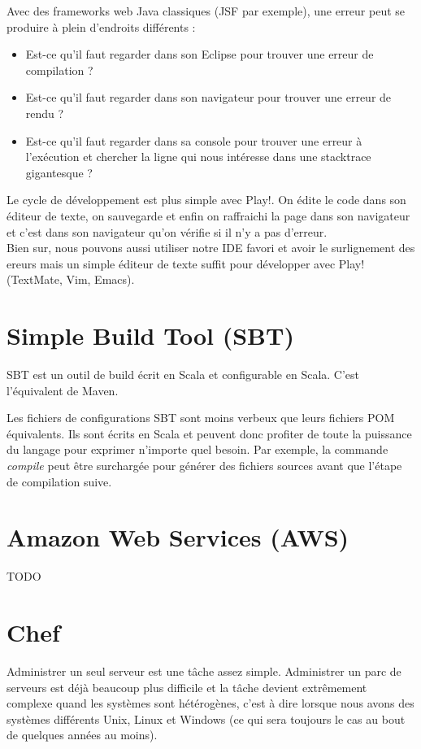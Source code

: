 Avec des frameworks web Java classiques (JSF par exemple), une erreur peut se
produire à plein d'endroits différents :
\begin{itemize}
\item Est-ce qu'il faut regarder dans son Eclipse pour trouver une erreur de
  compilation ?
\item Est-ce qu'il faut regarder dans son navigateur pour trouver une erreur de
  rendu ?
\item Est-ce qu'il faut regarder dans sa console pour trouver une erreur à
  l'exécution et chercher la ligne qui nous intéresse dans une stacktrace
  gigantesque ? 
\end{itemize}

\bigskip

Le cycle de développement est plus simple avec Play!.
On édite le code dans son éditeur de texte, on sauvegarde et enfin on raffraichi
la page dans son navigateur et c'est dans son navigateur qu'on vérifie si il n'y
a pas d'erreur. \\
Bien sur, nous pouvons aussi utiliser notre IDE favori et avoir le
surlignement des ereurs mais un simple éditeur de texte suffit pour développer
avec Play! (TextMate, Vim, Emacs).

\section{Simple Build Tool (SBT)}

SBT est un outil de build écrit en Scala et configurable en Scala.
C'est l'équivalent de Maven.  

Les fichiers de configurations SBT sont moins verbeux que leurs fichiers POM
équivalents. Ils sont écrits en Scala et peuvent donc profiter de toute la
puissance du langage pour exprimer n'importe quel besoin. Par exemple, 
la commande \textit{compile} peut être surchargée pour générer des fichiers sources avant
que l'étape de compilation suive.

\section{Amazon Web Services (AWS)}
TODO
\section{Chef}

Administrer un seul serveur est une tâche assez simple. Administrer un parc de
serveurs est déjà beaucoup plus difficile et la tâche devient extrêmement
complexe quand les systèmes sont hétérogènes, c'est à dire lorsque nous avons
des systèmes différents Unix, Linux et Windows (ce qui sera toujours le cas au
bout de quelques années au moins).\\


